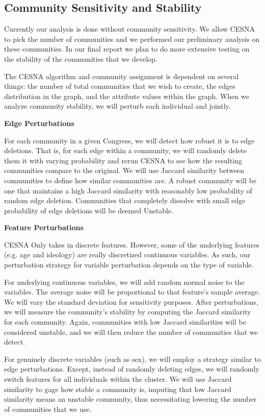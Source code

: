 \subsection{Community Sensitivity and Stability}

Currently our analysis is done without community sensitivity. We allow CESNA to
pick the number of communities and we performed our preliminary analysis on
these communities. In our final report we plan to do more extensive testing on
the stability of the communities that we develop.

The CESNA algorithm and community assignment is dependent on several things: the
number of total communities that we wish to create, the edges distribution in
the graph, and the attribute values within the graph. When we analyze community 
stability, we will perturb each individual and jointly.

\textbf{Edge Perturbations}

For each community in a given Congress, we will detect how robust it is to edge 
deletions. That is, for each edge within a community, we will randomly delete 
them it with varying probability and rerun CESNA to see how the resulting 
communities compare to the original. We will use Jaccard similarity between 
communities to define how similar communities are. A robust community will be 
one that maintains a high Jaccard similarity with reasonably low probability of 
random edge deletion. Communities that completely dissolve with small edge 
probability of edge deletions will be deemed Unstable.

\textbf{Feature Perturbations}

CESNA Only takes in discrete features. However, some of the underlying features 
(e.g. age and ideology) are really discretized continuous variables. As such, 
our perturbation strategy for variable perturbation depends on the type of 
variable.

For underlying continuous variables, we will add random normal noise to the
variables. The average noise will be proportional to that feature's sample
average. We will vary the standard deviation for sensitivity purposes. After
perturbations, we will measure the community's stability by computing the
Jaccard similarity for each community. Again, communities with low Jaccard
similarities will be considered unstable, and we will then reduce the number of
communities that we detect.

For genuinely discrete variables (such as sex), we will employ a strategy
similar to edge perturbations. Except, instead of randomly deleting edges, we
will randomly switch features for all individuals within the cluster. We will
use Jaccard similarity to gage how stable a community is, imputing that low 
Jaccard similarity means an unstable community, thus necessitating lowering 
the number of communities that we use.
